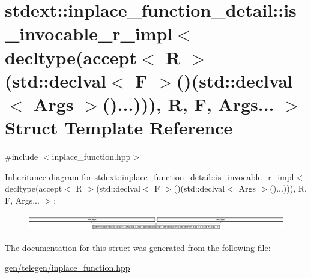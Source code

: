 \hypertarget{structstdext_1_1inplace__function__detail_1_1is__invocable__r__impl_3_01decltype_07accept_3_01R_32d81c51f4037807d0fe4b47c34d0755}{}\section{stdext\+:\+:inplace\+\_\+function\+\_\+detail\+:\+:is\+\_\+invocable\+\_\+r\+\_\+impl$<$ decltype(accept$<$ R $>$(std\+:\+:declval$<$ F $>$()(std\+:\+:declval$<$ Args $>$()...))), R, F, Args... $>$ Struct Template Reference}
\label{structstdext_1_1inplace__function__detail_1_1is__invocable__r__impl_3_01decltype_07accept_3_01R_32d81c51f4037807d0fe4b47c34d0755}


{\ttfamily \#include $<$inplace\+\_\+function.\+hpp$>$}

Inheritance diagram for stdext\+:\+:inplace\+\_\+function\+\_\+detail\+:\+:is\+\_\+invocable\+\_\+r\+\_\+impl$<$ decltype(accept$<$ R $>$(std\+:\+:declval$<$ F $>$()(std\+:\+:declval$<$ Args $>$()...))), R, F, Args... $>$\+:\begin{figure}[H]
\begin{center}
\leavevmode
\includegraphics[height=0.707965cm]{structstdext_1_1inplace__function__detail_1_1is__invocable__r__impl_3_01decltype_07accept_3_01R_32d81c51f4037807d0fe4b47c34d0755}
\end{center}
\end{figure}


The documentation for this struct was generated from the following file\+:\begin{DoxyCompactItemize}
\item 
\hyperlink{gen_2telegen_2inplace__function_8hpp}{gen/telegen/inplace\+\_\+function.\+hpp}\end{DoxyCompactItemize}

